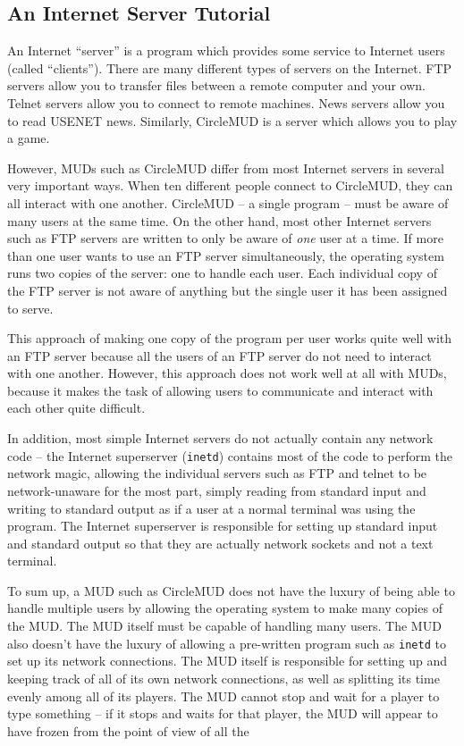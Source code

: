 \documentclass[11pt]{article}
\begin{document}
\subsection{An Internet Server Tutorial}
An Internet ``server'' is a program which provides some service to Internet users (called ``clients'').  There are many different types of servers on the Internet.  FTP servers allow you to transfer files between a remote computer and your own.  Telnet servers allow you to connect to remote machines.  News servers allow you to read USENET news.  Similarly, CircleMUD
is a server which allows you to play a game.
\par
However, MUDs such as CircleMUD differ from most Internet servers in several very important ways.  When ten different people connect to CircleMUD, they can all interact with one another.  CircleMUD -- a single program -- must be aware of many users at the same time.  On the other hand, most other Internet servers such as FTP servers are written to only be aware of {\em one}
user at a time.  If more than one user wants to use an FTP server simultaneously, the operating system runs two copies of the server: one to handle each user.  Each individual copy of the FTP server is not aware of anything but the single user it has been assigned to serve.
\par
This approach of making one copy of the program per user works quite well with an FTP server because all the users of an FTP server do not need to interact with one another.  However, this approach does not work well at all with MUDs, because it makes the task of allowing users to communicate and interact with each other quite difficult.
\par
In addition, most simple Internet servers do not actually contain any network code -- the Internet superserver (\texttt{inetd}) contains most of the code to perform the network magic, allowing the individual servers such as FTP and telnet to be network-unaware for the most part, simply reading from standard input and writing to standard output as if a user at a normal terminal was using the program.  The Internet superserver is responsible for setting up standard input and standard output so that they are actually network sockets and not a text terminal.
\par
To sum up, a MUD such as CircleMUD does not have the luxury of being able to handle multiple users by allowing the operating system to make many copies of the MUD.  The MUD itself must be capable of handling many users. The MUD also doesn't have the luxury of allowing a pre-written program such as \texttt{inetd} to set up its network connections.  The MUD itself is responsible for setting up and keeping track of all of its own network connections, as well as splitting its time evenly among all of its players.  The MUD cannot stop and wait for a player to type something -- if it stops and waits for that player, the MUD will appear to have frozen from the point of view of all the
\end{document}
